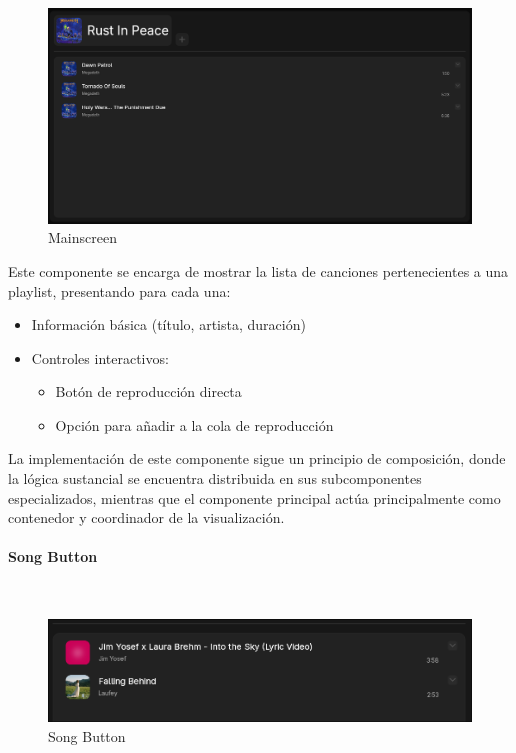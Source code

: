 \documentclass[11pt, a4paper]{article}
\begin{document}
            \begin{figure}[H]
                \centering
                \includegraphics[width=1\textwidth]{media/screenshots/playlist.png}
                \caption{Mainscreen}
                \label{fig:Mainscreen}
            \end{figure}

            Este componente se encarga de mostrar la lista de canciones pertenecientes a una playlist, presentando para cada una:

            \begin{itemize}
                \item Información básica (título, artista, duración)
                \item Controles interactivos:
                \begin{itemize}
                    \item Botón de reproducción directa
                    \item Opción para añadir a la cola de reproducción
                \end{itemize}
            \end{itemize}

            La implementación de este componente sigue un principio de composición, donde la lógica sustancial se encuentra distribuida en sus subcomponentes especializados, mientras que el componente principal actúa principalmente como contenedor y coordinador de la visualización. \\

                \paragraph{Song Button}
                ‎

                \begin{figure}[H]
                    \centering
                    \includegraphics[width=1\textwidth]{media/screenshots/songbutton.png}
                    \caption{Song Button}
                    \label{fig:songbutton}
                \end{figure}
\end{document}
